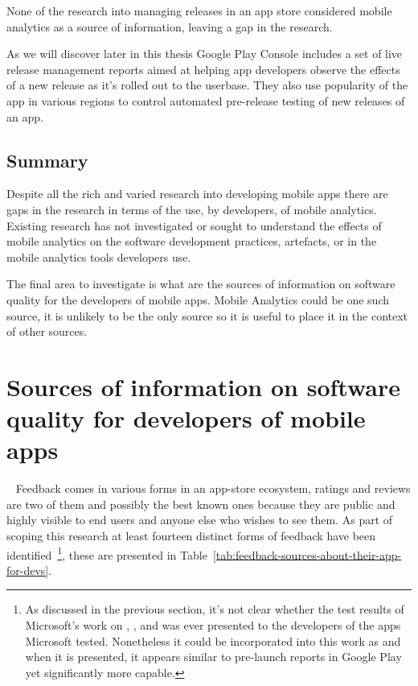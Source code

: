 None of the research into managing releases in an app store considered mobile analytics as a source of information, leaving a gap in the research.

As we will discover later in this thesis Google Play Console includes a set of live release management reports aimed at helping app developers observe the effects of a new release as it's rolled out to the userbase. They also use popularity of the app in various regions to control automated pre-release testing of new releases of an app. %

\subsection{Summary} 
Despite all the rich and varied research into developing mobile apps there are gaps in the research in terms of the use, by developers, of mobile analytics. Existing research has not investigated or sought to understand the effects of mobile analytics on the software development practices, artefacts, or in the mobile analytics tools developers use. 

The final area to investigate is what are the sources of information on software quality for the developers of mobile apps. Mobile Analytics could be one such source, it is unlikely to be the only source so it is useful to place it in the context of other sources.


\section{Sources of information on software quality for developers of mobile apps}~\label{rw-sources-of-info-on-software-quality-for-devs-of-mobile-apps}
Feedback comes in various forms in an app-store ecosystem, ratings and reviews are two of them and possibly the best known ones because they are public and highly visible to end users and anyone else who wishes to see them. As part of scoping this research at least fourteen distinct forms of feedback have been identified~\footnote{As discussed in the previous section, it's not clear whether the test results of Microsoft's work on , , and  was ever presented to the developers of the  apps Microsoft tested. Nonetheless it could be incorporated into this work as and when it is presented, it appears similar to pre-launch reports in Google Play yet significantly more capable.}, these are presented in Table~\ref{tab:feedback-sources-about-their-app-for-devs}.

